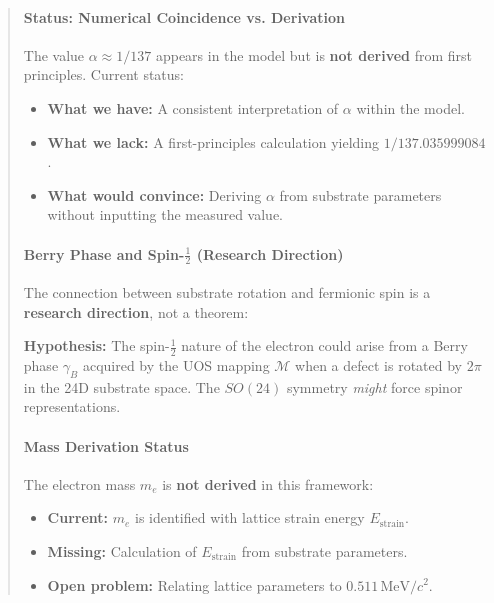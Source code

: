 \documentclass[11pt,titlepage]{article}
\begin{document}
\begin{abstract}
\paragraph{Status: Numerical Coincidence vs. Derivation}
The value $\alpha \approx 1/137$ appears in the model but is \textbf{not derived} from first principles. Current status:
\begin{itemize}
\item \textbf{What we have:} A consistent interpretation of $\alpha$ within the model.
\item \textbf{What we lack:} A first-principles calculation yielding $1/137.035999084$.
\item \textbf{What would convince:} Deriving $\alpha$ from substrate parameters without inputting the measured value.
\end{itemize}

\paragraph{Berry Phase and Spin-$\frac{1}{2}$ (Research Direction)}
The connection between substrate rotation and fermionic spin is a \textbf{research direction}, not a theorem:

\begin{tcolorbox}[colback=blue!5!white,colframe=blue!75!black,title=Research Direction: Spin from Substrate Geometry]
\label{rd:spin-berry}
\textbf{Hypothesis:} The spin-$\frac{1}{2}$ nature of the electron could arise from a Berry phase $\gamma_B$ acquired by the UOS mapping $\mathcal{M}$ when a defect is rotated by $2\pi$ in the 24D substrate space. The $SO(24)$ symmetry \emph{might} force spinor representations.
\end{tcolorbox}

\paragraph{Mass Derivation Status}
The electron mass $m_e$ is \textbf{not derived} in this framework:
\begin{itemize}
\item \textbf{Current:} $m_e$ is identified with lattice strain energy $E_{\text{strain}}$.
\item \textbf{Missing:} Calculation of $E_{\text{strain}}$ from substrate parameters.
\item \textbf{Open problem:} Relating lattice parameters to $0.511\,\text{MeV}/c^2$.
\end{itemize}


\end{abstract}
\end{document}

